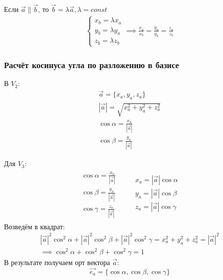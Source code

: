 Если $\vec{a} \parallel \vec{b}$, то $\vec{b} = \lambda \vec{a}, \lambda = const$
\begin{gather*}
  \begin{cases}
    x_b = \lambda x_a \\
    y_b = \lambda y_a \\
    z_b = \lambda z_b
  \end{cases}
  \implies 
  \frac{x_a}{x_b} = \frac{y_a}{y_b} = \frac{z_a}{z_b}
\end{gather*}

\subsubsection*{Расчёт косинуса угла по разложению в базисе}

\begin{eg}
  В $V_2$:
  \begin{gather*}
    \vec{a} = \{x_a, y_a, z_a\} \\
    |\vec{a}| = \sqrt{x_a^2 + y_a^2 + z_a^2} \\
    \cos \alpha = \frac{x_a}{|\vec{a}|} \\
    \cos \beta = \frac{y_a}{|\vec{a}|}
  \end{gather*}
\end{eg}

\begin{eg}
  Для $V_3$: \\
  \begin{gather*}
    \begin{matrix}
      \cos \alpha = \frac{x_a}{|\vec{a}|} \\
      \cos \beta = \frac{y_a}{|\vec{a}|} \\
      \cos \gamma = \frac{z_a}{|\vec{a}|}
    \end{matrix}
    \qquad
    \begin{matrix}
      x_a = |\vec{a}| \cos \alpha \\
      y_a = |\vec{a}| \cos \beta \\
      z_a = |\vec{a}| \cos \gamma \\
    \end{matrix}
  \end{gather*}
  Возведём в квадрат:
  \begin{gather*}
    |\vec{a}|^2 \cos^2 \alpha + |\vec{a}|^2 \cos^2 \beta + |\vec{a}|^2 \cos^2 \gamma = x_a^2 + y_a^2 + z_a^2 = |\vec{a}|^2 \\
    \implies \cos^2 \alpha + \cos^2 \beta + \cos^2 \gamma = 1
  \end{gather*}
  В результате получаем орт вектора $\vec{a}$: \[
  \vec{e_a} = \{\cos \alpha, \cos \beta, \cos \gamma\} 
  \] 
\end{eg}

